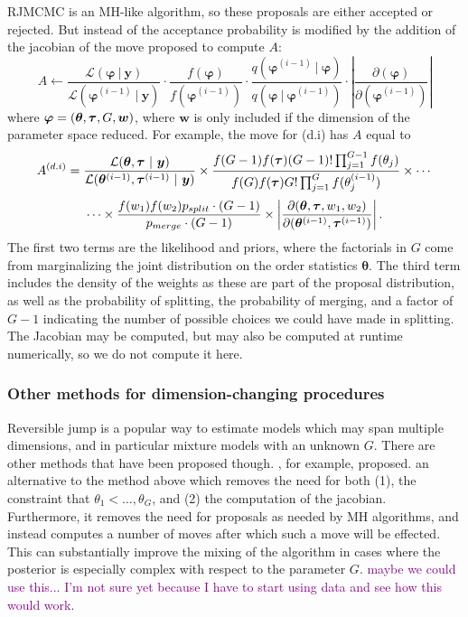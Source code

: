 \documentclass[twoside,12pt,bibstyle=chem-acs]{reedthesis}
\begin{document}
RJMCMC is an MH-like algorithm, so these proposals are either accepted or rejected. But instead of the acceptance probability is modified by the addition of the jacobian of the move proposed to compute $A$:
\begin{equation*}
A \gets \frac{\mathcal{L}(\bm\varphi ~|~ \bm{y})}{\mathcal{L}(\bm\varphi^{(i-1)} ~|~ \bm{y})} \cdot \frac{f(\bm\varphi)}{f(\bm\varphi^{(i-1)})} \cdot \frac{q(\bm\varphi^{(i-1)} ~|~ \bm\varphi)}{q(\bm\varphi ~|~ \bm\varphi^{(i-1)})} \cdot \left| \frac{\partial (\bm\varphi)}{\partial (\bm\varphi^{(i-1)})} \right|
\end{equation*}
where $\bm\varphi = (\bm\theta, \bm{\tau}, G, \bm{w})$, where $\bm{w}$ is only included if the dimension of the parameter space reduced. For example, the move for (d.i) has $A$ equal to
\begin{equation*}
A^{(d.i)} = \frac{\mathcal{L}(\bm\theta, \bm{\tau} ~|~ \bm{y})}{\mathcal{L}(\bm\theta^{(i-1)}, \bm{\tau}^{(i-1)} ~|~ \bm{y})} \times \frac{f(G-1) f(\bm\tau) (G-1)!\prod_{j=1}^{G-1} f(\theta_j)}{f(G) f(\bm\tau) G!\prod_{j=1}^{G}f(\theta_j^{(i-1)})}  \times \cdots
\end{equation*}
\begin{equation*}
\cdots \times \frac{f(w_1) f(w_2)p_{split} \cdot (G-1)}{p_{merge} \cdot (G-1)} \times \left| \frac{\partial (\bm\theta, \bm{\tau}, w_1, w_2)}{\partial (\bm\theta^{(i-1)}, \bm{\tau}^{(i-1)})} \right|.
\end{equation*}
The first two terms are the likelihood and priors, where the factorials in $G$ come from marginalizing the joint distribution on the order statistics $\bm\theta$. The third term includes the density of the weights as these are part of the proposal distribution, as well as the probability of splitting, the probability of merging, and a factor of $G-1$ indicating the number of possible choices we could have made in splitting. The Jacobian may be computed, but may also be computed at runtime numerically, so we do not compute it here.



\subsubsection{Other methods for dimension-changing procedures}
Reversible jump is a popular way to estimate models which may span multiple dimensions, and in particular mixture models with an unknown $G$. There are other methods that have been proposed though. \citeauthor{stephens_bayesian_2000}, for example, proposed. an alternative to the method above which removes the need for both (1), the constraint that $\theta_1 < \dots, \theta_G$, and (2) the computation of the jacobian. Furthermore, it removes the need for proposals as needed by MH algorithms, and instead computes a number of moves after which such a move will be effected. This can substantially improve the mixing of the algorithm in cases where the posterior is especially complex with respect to the parameter $G$. \textcolor{purple}{maybe we could use this... I'm not sure yet because I have to start using data and see how this would work}.
\end{document}
